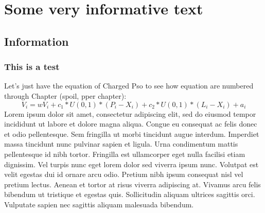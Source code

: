 \documentclass[../Thesis]{subfiles}
\begin{document}
\chapter{Some very informative text}
\section{Information}
\subsection{This is a test}

Let's just have the equation of Charged Pso to see how equation are numbered through Chapter (spoil, pper chapter):
\begin{equation} 
    V_{i} = wV_{i} + c_{1} * U(0,1) * (P_{i} - X_{i}) + c_{2} * U(0,1) * (L_{i} - X_{i}) + a_{i} \label{eqn:velocityChargedUpdate} 
\end{equation} 
Lorem ipsum dolor sit amet, consectetur adipiscing elit, sed do eiusmod tempor incididunt ut labore et dolore magna aliqua. Congue eu consequat ac felis donec et odio pellentesque. Sem fringilla ut morbi tincidunt augue interdum. Imperdiet massa tincidunt nunc pulvinar sapien et ligula. Urna condimentum mattis pellentesque id nibh tortor. Fringilla est ullamcorper eget nulla facilisi etiam dignissim. Vel turpis nunc eget lorem dolor sed viverra ipsum nunc. Volutpat est velit egestas dui id ornare arcu odio. Pretium nibh ipsum consequat nisl vel pretium lectus. Aenean et tortor at risus viverra adipiscing at. Vivamus arcu felis bibendum ut tristique et egestas quis. Sollicitudin aliquam ultrices sagittis orci. Vulputate sapien nec sagittis aliquam malesuada bibendum.
\end{document}
